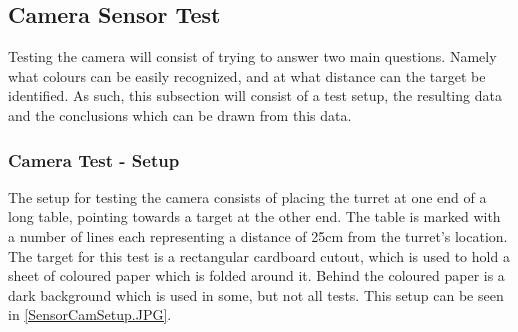 %
%

\subsection{Camera Sensor Test}\label{CamTest}%
Testing the camera will consist of trying to answer two main questions. Namely
what colours can be easily recognized, and at what distance can the target be
identified. As such, this subsection will consist of a test setup, the resulting
data and the conclusions which can be drawn from this data.

\subsubsection{Camera Test - Setup}\label{CamTestSetup}
The setup for testing the camera consists of placing the turret at one end of a
long table, pointing towards a target at the other end. The table is marked with
a number of lines each representing a distance of 25cm from the turret's
location. The target for this test is a rectangular cardboard cutout, which is
used to hold a sheet of coloured paper which is folded around it. Behind the
coloured paper is a dark background which is used in some, but not all tests.
This setup can be seen in \autoref{SensorCamSetup.JPG}.

